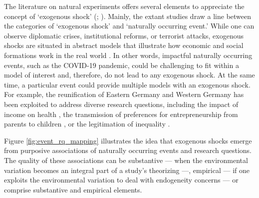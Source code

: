 \documentclass[11pt]{article}
\begin{document}
\begin{refsection}
\noindent The literature on natural experiments offers several elements to appreciate the concept of `exogenous shock' (\cite[for an overview of the natural experiment design, see][]{withers_li_2021, dunning_2012,craig_et_al_2017,keele_et_al_2016}; \cite[for a review of the application of this design, see][]{sekhon_titiunik_2012,sieweke_santoni_2020, roseinzweig_et_al_2000}). Mainly, the extant studies draw a line between the categories of `exogenous shock' and `naturally occurring event.' While one can observe diplomatic crises, institutional reforms, or terrorist attacks, exogenous shocks are situated in abstract models that illustrate how economic and social formations work in the real world \autocite{morgan_2012}. In other words, impactful naturally occurring events, such as the COVID-19  pandemic, could be challenging to fit within a model of interest and, therefore, do not lead to any exogenous shock. At the same time, a particular event could provide multiple models with an exogenous shock.  For example, the reunification of Eastern Germany and Western Germany has been exploited to address diverse research questions, including the impact of income on health \autocite[e.g.,][]{frijters_et_al_2004}, the transmission of preferences for entrepreneurship from parents to children \autocite[e.g.,][]{wyrwich_2015}, or the legitimation of inequality \autocite[e.g.,][]{haack_sieweke_2018}.

Figure \ref{fig:event_rq_mapping} illustrates the idea that exogenous shocks emerge from purposive associations of naturally occurring events and research questions. The quality of these associations can be substantive  --- when the environmental variation becomes an integral part of a study's theorizing ---, empirical --- if one exploits the environmental variation to deal with endogeneity concerns --- or comprise substantive and empirical elements.


\end{refsection}
\end{document}
